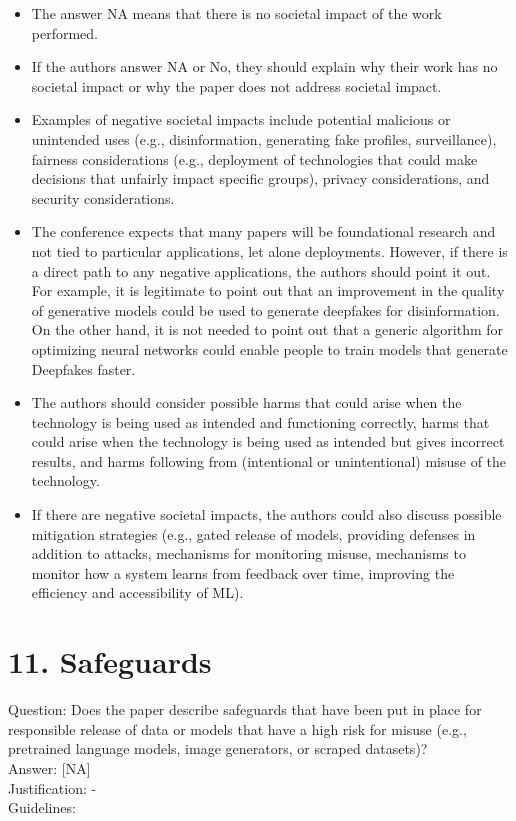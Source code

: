 \documentclass[10pt]{article}
\begin{document}
\begin{itemize}
  \item The answer NA means that there is no societal impact of the work performed.
  \item If the authors answer NA or No, they should explain why their work has no societal impact or why the paper does not address societal impact.
  \item Examples of negative societal impacts include potential malicious or unintended uses (e.g., disinformation, generating fake profiles, surveillance), fairness considerations (e.g., deployment of technologies that could make decisions that unfairly impact specific groups), privacy considerations, and security considerations.
  \item The conference expects that many papers will be foundational research and not tied to particular applications, let alone deployments. However, if there is a direct path to any negative applications, the authors should point it out. For example, it is legitimate to point out that an improvement in the quality of generative models could be used to generate deepfakes for disinformation. On the other hand, it is not needed to point out that a generic algorithm for optimizing neural networks could enable people to train models that generate Deepfakes faster.
  \item The authors should consider possible harms that could arise when the technology is being used as intended and functioning correctly, harms that could arise when the technology is being used as intended but gives incorrect results, and harms following from (intentional or unintentional) misuse of the technology.
  \item If there are negative societal impacts, the authors could also discuss possible mitigation strategies (e.g., gated release of models, providing defenses in addition to attacks, mechanisms for monitoring misuse, mechanisms to monitor how a system learns from feedback over time, improving the efficiency and accessibility of ML).
\end{itemize}

\section*{11. Safeguards}
Question: Does the paper describe safeguards that have been put in place for responsible release of data or models that have a high risk for misuse (e.g., pretrained language models, image generators, or scraped datasets)?\\[0pt]
Answer: [NA]\\
Justification: -\\
Guidelines:
\end{document}
